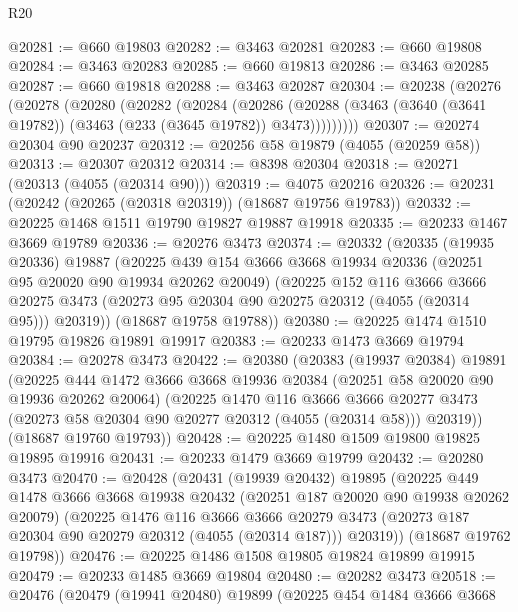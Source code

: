 \begin{lexlean}{R20}
\begin{coremodule}
@20281 := @660 @19803
@20282 := @3463 @20281
@20283 := @660 @19808
@20284 := @3463 @20283
@20285 := @660 @19813
@20286 := @3463 @20285
@20287 := @660 @19818
@20288 := @3463 @20287
@20304 := @20238
    (@20276
      (@20278
        (@20280
          (@20282
            (@20284
              (@20286
                (@20288 (@3463 (@3640 (@3641 @19782)) (@3463 (@233 (@3645 @19782)) @3473)))))))))
@20307 := @20274 @20304 @90 @20237
@20312 := @20256 @58 @19879 (@4055 (@20259 @58))
@20313 := @20307 @20312
@20314 := @8398 @20304
@20318 := @20271 (@20313 (@4055 (@20314 @90)))
@20319 := @4075 @20216
@20326 := @20231 (@20242 (@20265 (@20318 @20319)) (@18687 @19756 @19783))
@20332 := @20225 @1468 @1511 @19790 @19827 @19887 @19918
@20335 := @20233 @1467 @3669 @19789
@20336 := @20276 @3473
@20374 := @20332
    (@20335
      (@19935 @20336)
      @19887
      (@20225
        @439
        @154
        @3666
        @3668
        @19934
        @20336
        (@20251 @95 @20020 @90 @19934 @20262 @20049)
        (@20225
          @152
          @116
          @3666
          @3666
          @20275
          @3473
          (@20273 @95 @20304 @90 @20275 @20312 (@4055 (@20314 @95)))
          @20319))
      (@18687 @19758 @19788))
@20380 := @20225 @1474 @1510 @19795 @19826 @19891 @19917
@20383 := @20233 @1473 @3669 @19794
@20384 := @20278 @3473
@20422 := @20380
    (@20383
      (@19937 @20384)
      @19891
      (@20225
        @444
        @1472
        @3666
        @3668
        @19936
        @20384
        (@20251 @58 @20020 @90 @19936 @20262 @20064)
        (@20225
          @1470
          @116
          @3666
          @3666
          @20277
          @3473
          (@20273 @58 @20304 @90 @20277 @20312 (@4055 (@20314 @58)))
          @20319))
      (@18687 @19760 @19793))
@20428 := @20225 @1480 @1509 @19800 @19825 @19895 @19916
@20431 := @20233 @1479 @3669 @19799
@20432 := @20280 @3473
@20470 := @20428
    (@20431
      (@19939 @20432)
      @19895
      (@20225
        @449
        @1478
        @3666
        @3668
        @19938
        @20432
        (@20251 @187 @20020 @90 @19938 @20262 @20079)
        (@20225
          @1476
          @116
          @3666
          @3666
          @20279
          @3473
          (@20273 @187 @20304 @90 @20279 @20312 (@4055 (@20314 @187)))
          @20319))
      (@18687 @19762 @19798))
@20476 := @20225 @1486 @1508 @19805 @19824 @19899 @19915
@20479 := @20233 @1485 @3669 @19804
@20480 := @20282 @3473
@20518 := @20476
    (@20479
      (@19941 @20480)
      @19899
      (@20225
        @454
        @1484
        @3666
        @3668

\end{coremodule}
\end{lexlean}

